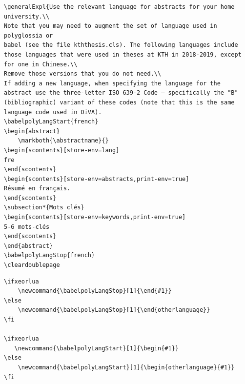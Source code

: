 \begin{lstlisting}[language={[LaTeX]TeX}, caption={Second example of the revised format for entering an abstract}, label=lst:babelSecondExample]
\generalExpl{Use the relevant language for abstracts for your home university.\\
Note that you may need to augment the set of language used in polyglossia or
babel (see the file kththesis.cls). The following languages include those languages that were used in theses at KTH in 2018-2019, except for one in Chinese.\\
Remove those versions that you do not need.\\
If adding a new language, when specifying the language for the abstract use the three-letter ISO 639-2 Code – specifically the "B" (bibliographic) variant of these codes (note that this is the same language code used in DiVA).
\babelpolyLangStart{french}
\begin{abstract}
    \markboth{\abstractname}{}
\begin{scontents}[store-env=lang]
fre
\end{scontents}
\begin{scontents}[store-env=abstracts,print-env=true]
Résumé en français.
\end{scontents}
\subsection*{Mots clés}
\begin{scontents}[store-env=keywords,print-env=true]
5-6 mots-clés
\end{scontents}
\end{abstract}
\babelpolyLangStop{french}
\cleardoublepage
\end{lstlisting}
\begin{lstlisting}[language={[LaTeX]TeX}, caption={The two commands used to help enter the language specification}, label=lst:babelCMDS]
\ifxeorlua
    \newcommand{\babelpolyLangStop}[1]{\end{#1}}
\else
    \newcommand{\babelpolyLangStop}[1]{\end{otherlanguage}}
\fi

\ifxeorlua
   \newcommand{\babelpolyLangStart}[1]{\begin{#1}}
\else
    \newcommand{\babelpolyLangStart}[1]{\begin{otherlanguage}{#1}}
\fi
\end{lstlisting}


